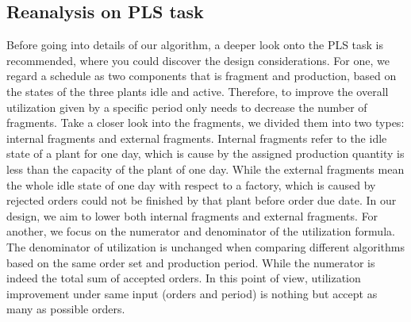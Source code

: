 \documentclass[conference]{IEEEtran}
\begin{document}
\subsection{Reanalysis on PLS task}
Before going into details of our algorithm, a deeper look onto the PLS task is recommended, where you could discover the design considerations. 
For one, we regard a schedule as two components that is fragment and production, based on the states of the three plants idle and active. Therefore, to improve the overall utilization given by a specific period only needs to decrease the number of fragments. Take a closer look into the fragments, we divided them into two types: internal fragments and external fragments. Internal fragments refer to the idle state of a plant for one day, which is cause by the assigned production quantity is less than the capacity of the plant of one day. While the external fragments mean the whole idle state of one day with respect to a factory, which is caused by rejected orders could not be finished by that plant before order due date. In our design, we aim to lower both internal fragments and external fragments.
For another, we focus on the numerator and denominator of the utilization formula. The denominator of utilization is unchanged when comparing different algorithms based on the same order set and production period. While the numerator is indeed the total sum of accepted orders. In this point of view, utilization improvement under same input (orders and period) is nothing but accept as many as possible orders.
\end{document}
